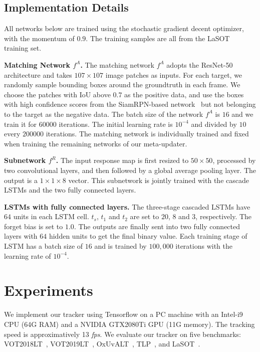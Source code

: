 \documentclass[10pt,twocolumn,letterpaper]{article}
\begin{document}
\subsection{Implementation Details}
\vspace{-2mm}
All networks below are trained using the stochastic gradient decent optimizer,
with the momentum of $0.9$.
The training samples are all from the LaSOT~\cite{LaSOT} training set.


\noindent \textbf{Matching Network ${f^A}$. }
The matching network ${f^A}$ adopts the ResNet-50 architecture and takes $107\times 107$
image patches as inputs.
For each target, we randomly sample bounding boxes around the groundtruth in each frame.
We choose the patches with IoU above $0.7$ as the positive data, and use the boxes with high
confidence scores from the SiamRPN-based network~\cite{Zhang-VOT18-MBMD} but not
belonging to the target as the negative data.
The batch size of the network ${f^A}$ is $16$ and we train it for $60000$ iterations.
The initial learning rate is $10^{-4}$ and divided by $10$ every $200000$ iterations.
The matching network is individually trained and fixed when training the remaining networks
of our meta-updater.

\noindent \textbf{Subnetwork ${f^R}$.}
The input response map is first resized to $50\times 50$, processed by two convolutional layers,
and then followed by a global average pooling layer.
The output is a $1\times1\times8$ vector. This subnetwork is jointly trained with the
cascade LSTMs and the two fully connected layers.

\noindent \textbf{LSTMs with fully connected layers.}
The three-stage cascaded LSTMs have $64$ units in each LSTM cell.
$t_s$, $t_1$ and $t_2$ are set to $20$, $8$ and $3$, respectively.
The forget bias is set to $1.0$.
The outputs are finally sent into two fully connected layers with $64$ hidden units to get the final binary value.
Each training stage of LSTM has a batch size of $16$ and is trained by $100, 000$ iterations with the
learning rate of $10^{-4}$.

\vspace{-2mm}
\section{Experiments}
\vspace{-2mm}
We implement our tracker using Tensorflow on a PC machine with an Intel-i9 CPU (64G RAM)
and a NVIDIA GTX2080Ti GPU (11G memory). The tracking speed is approximatively 13
\emph{fps}.
We evaluate our tracker on five benchmarks: VOT2018LT~\cite{VOT2018report},
VOT2019LT~\cite{VOT2019report}, OxUvALT~\cite{OxUvA},
TLP~\cite{moudgil2018long}, and LaSOT~\cite{LaSOT}.
\end{document}
